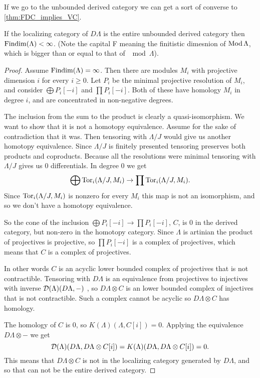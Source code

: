 
If we go to the unbounded derived category we can get a sort of converse to \cref{thm:FDC_implies_VC}.

\begin{theorem}\cite[Theorem~4.3]{Rick19}\label{thm:injectives_generate_implies_FDC}
	If the localizing category of $D\Lambda$ is the entire unbounded derived category then $\operatorname{Findim}(\Lambda) < \infty$. (Note the capital F meaning the finitistic dimesnion of $\operatorname{Mod}\Lambda$, which is bigger than or equal to that of $\mod\Lambda$).
	
	\begin{proof}
		Assume $\operatorname{Findim}(\Lambda) = \infty$. Then there are modules $M_i$ with projective dimension $i$ for every $i \geq 0$. Let $P_i$ be the minimal projective resolution of $M_i$, and consider $\bigoplus P_i[-i]$ and $\prod P_i[-i]$. Both of these have homology $M_i$ in degree $i$, and are concentrated in non-negative degrees.
		
		The inclusion from the sum to the product is clearly a quasi-isomorphism. We want to show that it is not a homotopy equivalence. Assume for the sake of contradiction that it was. Then tensoring with $\Lambda/J$ would give us another homotopy equivalence. Since $\Lambda/J$ is finitely presented tensoring preserves both products and coproducts. Because all the resolutions were minimal tensoring with $\Lambda/J$ gives us 0 differentials. In degree 0 we get $$\bigoplus \operatorname{Tor}_i(\Lambda/J, M_i) \to \prod \operatorname{Tor}_i(\Lambda/J, M_i) .$$
		Since $\operatorname{Tor}_i(\Lambda/J, M_i)$ is nonzero for every $M_i$ this map is not an isomorphism, and so we don't have a homotopy equivalence.
		
		So the cone of the inclusion $\bigoplus P_i[-i] \to \prod P_i[-i]$, $C$, is 0 in the derived category, but non-zero in the homotopy category. Since $\Lambda$ is artinian the product of projectives is projective\cite[Theorem~3.3]{Chase60}, so $\prod P_i[-i]$ is a complex of projectives, which means that $C$ is a complex of projectives. 
		
		In other words $C$ is an acyclic lower bounded complex of projectives that is not contractible. Tensoring with $D\Lambda$ is an equivalence from projectives to injectives with inverse $\operatorname{\mathcal{D}}(\Lambda)(D\Lambda, -)$ , so $D\Lambda \otimes C$ is an lower bounded complex of injectives that is not contractible. Such a complex cannot be acyclic so $D\Lambda \otimes C$ has homology.
		
		The homology of $C$ is 0, so $K(\Lambda)(\Lambda, C[i]) = 0$. Applying the equivalence $D\Lambda \otimes -$ we get $$\operatorname{\mathcal{D}}(\Lambda)(D\Lambda, D\Lambda \otimes C [i])=K(\Lambda)(D\Lambda, D\Lambda \otimes C [i])=0.$$ This means that $D\Lambda \otimes C$ is not in the localizing category generated by $D\Lambda$, and so that can not be the entire derived category.
	\end{proof}
\end{theorem}

